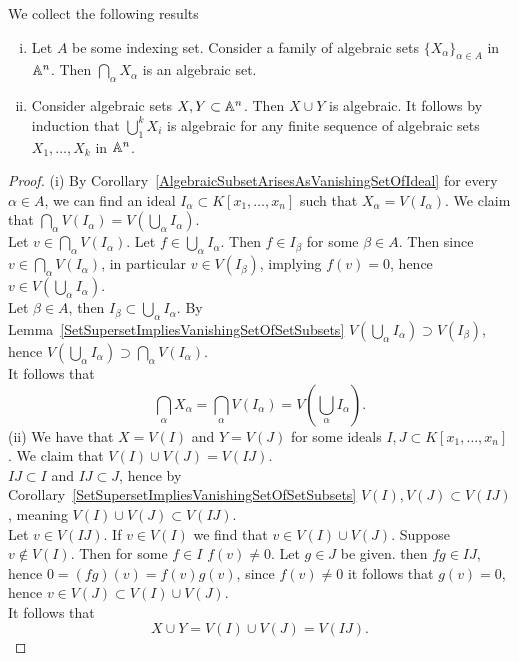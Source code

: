 \begin{lemma}\label{AlgebraicSubsetsAreClosedUnderIntersectionAndFiniteUnion}
    We collect the following results
    \begin{enumerate}[(i)]
        \item Let $A$ be some indexing set. Consider a family of algebraic sets $\{X_\alpha\}_{\alpha\in A}$ in $\mathbb{A}^n$. Then $\bigcap_{\alpha} X_\alpha$ is an algebraic set.
        \item Consider algebraic sets $X,Y\subset \mathbb{A}^n$. Then $X\cup Y$ is algebraic. It follows by induction that $\bigcup_1^k X_i$ is algebraic for any finite sequence of algebraic sets $X_1,\dots,X_k$ in $\mathbb{A}^n$.  
    \end{enumerate}
\end{lemma}
\begin{proof}
    (i) By Corollary~\ref{AlgebraicSubsetArisesAsVanishingSetOfIdeal} for every $\alpha\in A$, we can find an ideal $I_\alpha \subset K[x_1,\dots,x_n]$ such that $X_\alpha = V(I_\alpha)$. We claim that $\bigcap_\alpha V(I_\alpha) = V\left( \bigcup_\alpha I_\alpha\right)$.\\
    Let $v \in \bigcap_\alpha V(I_\alpha)$. Let $f\in \bigcup_\alpha I_\alpha$. Then $f\in I_\beta$ for some $\beta\in A$. Then since $v \in \bigcap_\alpha V(I_\alpha)$, in particular $v\in V(I_\beta)$, implying $f(v) = 0$, hence $v\in V\left( \bigcup_\alpha I_\alpha\right)$.\\
    Let $\beta\in A$, then $I_\beta \subset \bigcup_\alpha I_\alpha$. By Lemma~\ref{SetSupersetImpliesVanishingSetOfSetSubsets} $V\left(\bigcup_\alpha I_\alpha\right) \supset V(I_\beta)$, hence $V\left(\bigcup_\alpha I_\alpha\right) \supset \bigcap_\alpha V(I_\alpha)$.\\
    It follows that 
    $$\bigcap_\alpha X_\alpha =\bigcap_\alpha V(I_\alpha) = V\left(\bigcup_\alpha I_\alpha\right).$$
    (ii) We have that $X= V(I)$ and $Y = V(J)$ for some ideals $I,J\subset K[x_1,\dots,x_n]$. We claim that $V(I)\cup V(J) = V(IJ)$.\\ 
    $IJ\subset I$ and $IJ \subset J$, hence by Corollary~\ref{SetSupersetImpliesVanishingSetOfSetSubsets} $V(I),V(J)\subset V(IJ)$, meaning $V(I)\cup V(J) \subset V(IJ)$.\\
    Let $v\in V(IJ)$. If $v\in V(I)$ we find that $v\in V(I)\cup V(J)$. Suppose $v\notin V(I)$. Then for some $f\in I$ $f(v)\neq 0$. Let $g\in J$ be given. then $fg\in IJ$, hence $0 = (fg)(v) = f(v)g(v)$, since $f(v)\neq 0$ it follows that $g(v)= 0$, hence $v\in V(J)\subset V(I)\cup V(J)$.\\
    It follows that 
    $$X\cup Y = V(I)\cup V(J) = V(IJ).$$
\end{proof}
